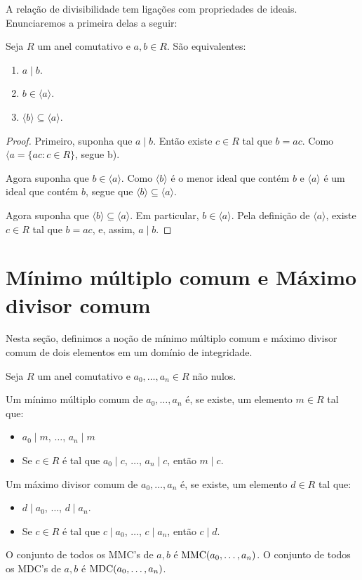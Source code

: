 A relação de divisibilidade tem ligações com propriedades de ideais.
Enunciaremos a primeira delas a seguir:

\begin{prop}
Seja $R$ um anel comutativo e $a, b \in R$.
São equivalentes:
\begin{enumerate}[label=\alph*)]
    \item $a\mid b$.
    \item $b \in \langle a \rangle$.
    \item $\langle b\rangle \subseteq \langle a \rangle$.
\end{enumerate}
\end{prop}
\begin{proof}
    Primeiro, suponha que $a\mid b$.
    Então existe $c \in R$ tal que $b=ac$.
    Como $\langle a=\{ac: c \in R\}$, segue b).

    Agora suponha que $b \in \langle a\rangle$.
    Como $\langle b\rangle$ é o menor ideal que contém $b$ e $\langle a\rangle$ é um ideal que contém $b$, segue que $\langle b\rangle \subseteq \langle a\rangle$.

    Agora suponha que $\langle b\rangle \subseteq \langle a\rangle$.
    Em particular, $b \in \langle a\rangle$.
    Pela definição de $\langle a \rangle$, existe $c \in R$ tal que $b=ac$, e, assim, $a\mid b$.
\end{proof}

\section{Mínimo múltiplo comum e Máximo divisor comum}

Nesta seção, definimos a noção de mínimo múltiplo comum e máximo divisor comum de dois elementos em um domínio de integridade.
\begin{definition}
Seja $R$ um anel comutativo e $a_0, \dots, a_n \in R$ não nulos.

Um mínimo múltiplo comum de $a_0, \dots, a_n$ é, se existe, um elemento $m\in R$ tal que:
\begin{itemize}
    \item $a_0\mid m$, $\dots$, $a_n\mid m$
    \item Se $c\in R$ é tal que $a_0\mid c$, $\dots$, $a_n\mid c$, então $m\mid c$.
\end{itemize}

Um máximo divisor comum de $a_0, \dots, a_n$ é, se existe, um elemento $d\in R$ tal que:
\begin{itemize}
    \item $d\mid a_0$, $\dots$, $d\mid a_n$.
    \item Se $c\in R$ é tal que $c\mid a_0$, $\dots$,  $c\mid a_n$, então $c\mid d$.
\end{itemize}

O conjunto de todos os MMC's de $a, b$ é $\operatorname{MMC}(a_0, \dots, a_n)$.
O conjunto de todos os MDC's de $a, b$ é $\operatorname{MDC}(a_0, \dots, a_n)$.
\end{definition}

